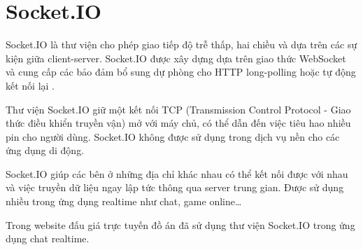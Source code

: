 \documentclass[../DoAn.tex]{subfiles}
\begin{document}
\section{Socket.IO}
\label{section:3.5}
Socket.IO là thư viện cho phép giao tiếp độ trễ thấp, hai chiều và dựa trên các sự kiện giữa client-server. Socket.IO được xây dựng dựa trên giao thức WebSocket và cung cấp các bảo đảm bổ sung dự phòng cho HTTP long-polling hoặc tự động kết nối lại \cite{Socket.IO}.

Thư viện Socket.IO giữ một kết nối TCP (Transmission Control Protocol - Giao thức điều khiển truyền vận) mở với máy chủ, có thể dẫn đến việc tiêu hao nhiều pin cho người dùng. Socket.IO không được sử dụng trong dịch vụ nền cho các ứng dụng di động\cite{Socket2}. 

Socket.IO giúp các bên ở những địa chỉ khác nhau có thể kết nối được với nhau và việc truyền dữ liệu ngay lập tức thông qua server trung gian. Được sử dụng nhiều trong ứng dụng realtime như chat, game online…

Trong website đấu giá trực tuyến đồ án đã sử dụng thư viện Socket.IO trong ứng dụng chat realtime.
\end{document}
